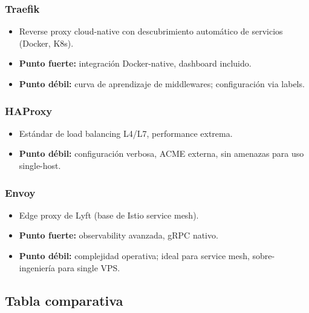 \documentclass[11pt,a4paper]{article}
\begin{document}
\subsubsection{Traefik}
\begin{itemize}[leftmargin=*,itemsep=0pt]
\item Reverse proxy cloud-native con descubrimiento automático de servicios (Docker, K8s).
\item \textbf{Punto fuerte:} integración Docker-native, dashboard incluido.
\item \textbf{Punto débil:} curva de aprendizaje de middlewares; configuración via labels.
\end{itemize}

\subsubsection{HAProxy}
\begin{itemize}[leftmargin=*,itemsep=0pt]
\item Estándar de load balancing L4/L7, performance extrema.
\item \textbf{Punto débil:} configuración verbosa, ACME externa, sin amenazas para uso single-host.
\end{itemize}

\subsubsection{Envoy}
\begin{itemize}[leftmargin=*,itemsep=0pt]
\item Edge proxy de Lyft (base de Istio service mesh).
\item \textbf{Punto fuerte:} observability avanzada, gRPC nativo.
\item \textbf{Punto débil:} complejidad operativa; ideal para service mesh, sobre-ingeniería para single VPS.
\end{itemize}

\subsection{Tabla comparativa}
\end{document}
